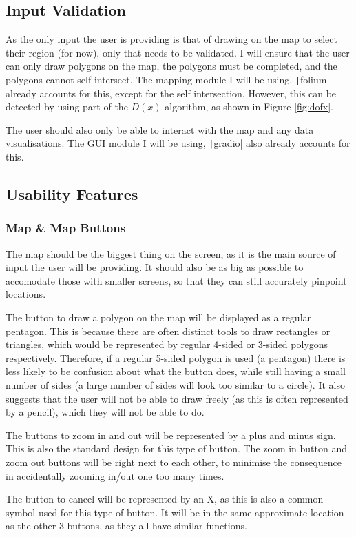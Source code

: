\documentclass[12pt]{report}
\newcommand{\pil}[1]{\protect\texttt|#1|}
\begin{document}
\subsection{Input Validation}
As the only input the user is providing is that of drawing on the map to select their region (for now), only that needs to be validated. I will ensure that the user can only draw polygons on the map, the polygons must be completed, and the polygons cannot self intersect. The mapping module I will be using, \pil{folium} already accounts for this, except for the self intersection. However, this can be detected by using part of the $D\left(x\right)$ algorithm, as shown in Figure \ref{fig:dofx}.

The user should also only be able to interact with the map and any data visualisations. The GUI module I will be using, \pil{gradio} also already accounts for this.

\subsection{Usability Features}
\subsubsection{Map \& Map Buttons}
The map should be the biggest thing on the screen, as it is the main source of input the user will be providing. It should also be as big as possible to accomodate those with smaller screens, so that they can still accurately pinpoint locations.

The button to draw a polygon on the map will be displayed as a regular pentagon. This is because there are often distinct tools to draw rectangles or triangles, which would be represented by regular 4-sided or 3-sided polygons respectively. Therefore, if a regular 5-sided polygon is used (a pentagon) there is less likely to be confusion about what the button does, while still having a small number of sides (a large number of sides will look too similar to a circle). It also suggests that the user will not be able to draw freely (as this is often represented by a pencil), which they will not be able to do.

The buttons to zoom in and out will be represented by a plus and minus sign. This is also the standard design for this type of button. The zoom in button and zoom out buttons will be right next to each other, to minimise the consequence in accidentally zooming in/out one too many times.

The button to cancel will be represented by an X, as this is also a common symbol used for this type of button. It will be in the same approximate location as the other 3 buttons, as they all have similar functions.
\end{document}
